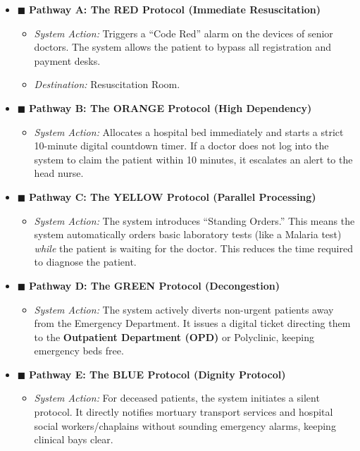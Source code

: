 \documentclass[12pt, a4paper]{article}
\begin{document}
	\begin{itemize}
		\item \textcolor{triageRed}{$\blacksquare$} \textbf{Pathway A: The RED Protocol (Immediate Resuscitation)}
		\begin{itemize}
			\item \textit{System Action:} Triggers a ``Code Red'' alarm on the devices of senior doctors. The system allows the patient to bypass all registration and payment desks.
			\item \textit{Destination:} Resuscitation Room.
		\end{itemize}
		
		\item \textcolor{triageOrange}{$\blacksquare$} \textbf{Pathway B: The ORANGE Protocol (High Dependency)}
		\begin{itemize}
			\item \textit{System Action:} Allocates a hospital bed immediately and starts a strict 10-minute digital countdown timer. If a doctor does not log into the system to claim the patient within 10 minutes, it escalates an alert to the head nurse.
		\end{itemize}
		
		\item \textcolor{triageYellow}{$\blacksquare$} \textbf{Pathway C: The YELLOW Protocol (Parallel Processing)}
		\begin{itemize}
			\item \textit{System Action:} The system introduces ``Standing Orders.'' This means the system automatically orders basic laboratory tests (like a Malaria test) \textit{while} the patient is waiting for the doctor. This reduces the time required to diagnose the patient.
		\end{itemize}
		
		\item \textcolor{triageGreen}{$\blacksquare$} \textbf{Pathway D: The GREEN Protocol (Decongestion)}
		\begin{itemize}
			\item \textit{System Action:} The system actively diverts non-urgent patients away from the Emergency Department. It issues a digital ticket directing them to the \textbf{Outpatient Department (OPD)} or Polyclinic, keeping emergency beds free.
		\end{itemize}
		
		\item \textcolor{triageBlue}{$\blacksquare$} \textbf{Pathway E: The BLUE Protocol (Dignity Protocol)}
		\begin{itemize}
			\item \textit{System Action:} For deceased patients, the system initiates a silent protocol. It directly notifies mortuary transport services and hospital social workers/chaplains without sounding emergency alarms, keeping clinical bays clear.
		\end{itemize}
	\end{itemize}
	
\end{document}
